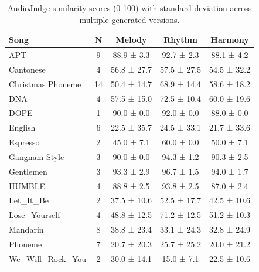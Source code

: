 
\begin{table}[t]
\centering
\small
\caption{AudioJudge similarity scores (0-100) with standard deviation across multiple generated versions.}
\label{tab:audiojudge-all-songs}
\begin{tabular}{lcccc}
\toprule
\textbf{Song} & \textbf{N} & \textbf{Melody} & \textbf{Rhythm} & \textbf{Harmony} \\
\midrule
APT & 9 & 88.9 ± 3.3 & 92.7 ± 2.3 & 88.1 ± 4.2 \\
Cantonese & 4 & 56.8 ± 27.7 & 57.5 ± 27.5 & 54.5 ± 32.2 \\
Christmas Phoneme & 14 & 50.4 ± 14.7 & 68.9 ± 14.4 & 58.6 ± 18.2 \\
DNA & 4 & 57.5 ± 15.0 & 72.5 ± 10.4 & 60.0 ± 19.6 \\
DOPE & 1 & 90.0 ± 0.0 & 92.0 ± 0.0 & 88.0 ± 0.0 \\
English & 6 & 22.5 ± 35.7 & 24.5 ± 33.1 & 21.7 ± 33.6 \\
Espresso & 2 & 45.0 ± 7.1 & 60.0 ± 0.0 & 50.0 ± 7.1 \\
Gangnam Style & 3 & 90.0 ± 0.0 & 94.3 ± 1.2 & 90.3 ± 2.5 \\
Gentlemen & 3 & 93.3 ± 2.9 & 96.7 ± 1.5 & 94.0 ± 1.7 \\
HUMBLE & 4 & 88.8 ± 2.5 & 93.8 ± 2.5 & 87.0 ± 2.4 \\
Let_It_Be & 2 & 37.5 ± 10.6 & 52.5 ± 17.7 & 42.5 ± 10.6 \\
Lose_Yourself & 4 & 48.8 ± 12.5 & 71.2 ± 12.5 & 51.2 ± 10.3 \\
Mandarin & 8 & 38.8 ± 23.4 & 33.1 ± 24.3 & 32.8 ± 24.9 \\
Phoneme & 7 & 20.7 ± 20.3 & 25.7 ± 25.2 & 20.0 ± 21.2 \\
We_Will_Rock_You & 2 & 30.0 ± 14.1 & 15.0 ± 7.1 & 22.5 ± 10.6 \\
\bottomrule
\end{tabular}
\end{table}
